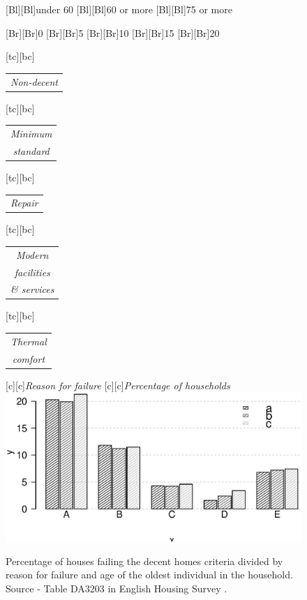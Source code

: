 \documentclass[11 pt, a4paper]{report}
\renewcommand{\arraystretch}{1.2}
\begin{document}
\begin{figure}[hbtp!]
\centering
{}[Bl][Bl]{\small{under 60}}
[Bl][Bl]{\small{60 or more}}
[Bl][Bl]{\small{75 or more}}

[Br][Br]{\small{0}}
[Br][Br]{\small{5}}
[Br][Br]{\small{10}}
[Br][Br]{\small{15}}
[Br][Br]{\small{20}}

\renewcommand{\arraystretch}{0.7}
[tc][bc]{\scriptsize{
\begin{tabular}{c}
\emph{Non-decent}\\
\end{tabular}
}}
[tc][bc]{\scriptsize{
\begin{tabular}{c}
\emph{Minimum}\\
\emph{standard}
\end{tabular}
}}
[tc][bc]{\scriptsize{
\begin{tabular}{c}
\emph{Repair}\\
\end{tabular}
}}
[tc][bc]{\scriptsize{
\begin{tabular}{c}
\emph{Modern}\\
\emph{facilities}\\
\emph{\& services}
\end{tabular}
}}
[tc][bc]{\scriptsize{
\begin{tabular}{c}
\emph{Thermal}\\
\emph{comfort}
\end{tabular}
}}
[c][c]{\small{\emph{Reason for failure}}}
[c][c]{\small{\emph{Percentage of households}}}
\includegraphics[width=\textwidth]{../figures/Fig6.4.eps}
\caption{Percentage of houses failing the decent homes criteria divided by reason for failure and age of the oldest individual in the household. Source - Table DA3203 in English Housing Survey \citep{DCLG2013}.}\label{Fig:66} %
\end{figure}
\end{document}
